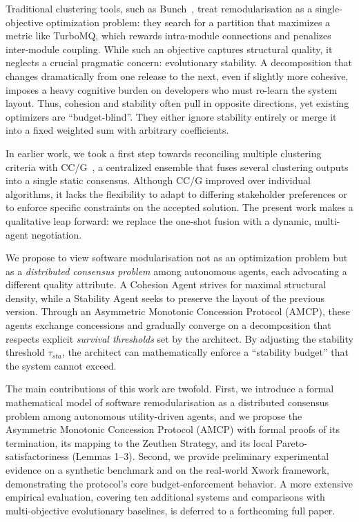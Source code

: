 \documentclass[conference]{IEEEtran}
\begin{document}
Traditional clustering tools, such as Bunch~\cite{Mitchell2006}, treat remodularisation as a single-objective optimization problem: they search for a partition that maximizes a metric like TurboMQ, which rewards intra-module connections and penalizes inter-module coupling. While such an objective captures structural quality, it neglects a crucial pragmatic concern: evolutionary stability. A decomposition that changes dramatically from one release to the next, even if slightly more cohesive, imposes a heavy cognitive burden on developers who must re-learn the system layout. Thus, cohesion and stability often pull in opposite directions, yet existing optimizers are ``budget-blind''. They either ignore stability entirely or merge it into a fixed weighted sum with arbitrary coefficients.

In earlier work, we took a first step towards reconciling multiple clustering criteria with CC/G~\cite{Ibrahim2014,Ibrahim2014CCECE}, a centralized ensemble that fuses several clustering outputs into a single static consensus. Although CC/G improved over individual algorithms, it lacks the flexibility to adapt to differing stakeholder preferences or to enforce specific constraints on the accepted solution. The present work makes a qualitative leap forward: we replace the one-shot fusion with a dynamic, multi-agent negotiation.

We propose to view software modularisation not as an optimization problem but as a \emph{distributed consensus problem} among autonomous agents, each advocating a different quality attribute. A Cohesion Agent strives for maximal structural density, while a Stability Agent seeks to preserve the layout of the previous version. Through an Asymmetric Monotonic Concession Protocol (AMCP), these agents exchange concessions and gradually converge on a decomposition that respects explicit \emph{survival thresholds} set by the architect. By adjusting the stability threshold $\tau_{sta}$, the architect can mathematically enforce a “stability budget” that the system cannot exceed.

The main contributions of this work are twofold. First, we introduce a formal mathematical model of software remodularisation as a distributed consensus problem among autonomous utility-driven agents, and we propose the Asymmetric Monotonic Concession Protocol (AMCP) with formal proofs of its termination, its mapping to the Zeuthen Strategy, and its local Pareto-satisfactoriness (Lemmas 1--3). Second, we provide preliminary experimental evidence on a synthetic benchmark and on the real‑world Xwork framework, demonstrating the protocol's core budget‑enforcement behavior. A more extensive empirical evaluation, covering ten additional systems and comparisons with multi‑objective evolutionary baselines, is deferred to a forthcoming full paper.
\end{document}
